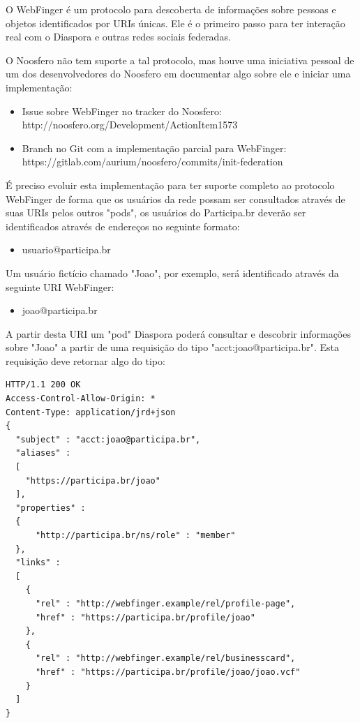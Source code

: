 \documentclass[12pt]{article}
\begin{document}
O WebFinger é um protocolo para descoberta de informações sobre pessoas e
objetos identificados por URIs únicas. Ele é o primeiro passo para ter
interação real com o Diaspora e outras redes sociais federadas.

O Noosfero não tem suporte a tal protocolo, mas houve uma iniciativa pessoal
de um dos desenvolvedores do Noosfero em documentar algo sobre ele e iniciar
uma implementação:

\begin{itemize}
  \item Issue sobre WebFinger no tracker do Noosfero: \\
    http://noosfero.org/Development/ActionItem1573
  \item Branch no Git com a implementação parcial para WebFinger: \\
    https://gitlab.com/aurium/noosfero/commits/init-federation
\end{itemize}

É preciso evoluir esta implementação para ter suporte completo ao protocolo
WebFinger de forma que os usuários da rede possam ser consultados através de
suas URIs pelos outros "pods", os usuários do Participa.br deverão ser
identificados através de endereços no seguinte formato:

\begin{itemize}
  \item usuario@participa.br
\end{itemize}

Um usuário fictício chamado "Joao", por exemplo, será identificado através da
seguinte URI WebFinger:

\begin{itemize}
  \item joao@participa.br
\end{itemize}

A partir desta URI um "pod" Diaspora poderá consultar e descobrir informações
sobre "Joao" a partir de uma requisição do tipo "acct:joao@participa.br". Esta
requisição deve retornar algo do tipo:

\begin{framed}
\begin{lstlisting}[caption=Exemplo resposta a consulta WebFinger]
HTTP/1.1 200 OK
Access-Control-Allow-Origin: *
Content-Type: application/jrd+json
{
  "subject" : "acct:joao@participa.br",
  "aliases" :
  [
    "https://participa.br/joao"
  ],
  "properties" :
  {
      "http://participa.br/ns/role" : "member"
  },
  "links" :
  [
    {
      "rel" : "http://webfinger.example/rel/profile-page",
      "href" : "https://participa.br/profile/joao"
    },
    {
      "rel" : "http://webfinger.example/rel/businesscard",
      "href" : "https://participa.br/profile/joao/joao.vcf"
    }
  ]
}
\end{lstlisting}
\end{framed}
\end{document}
